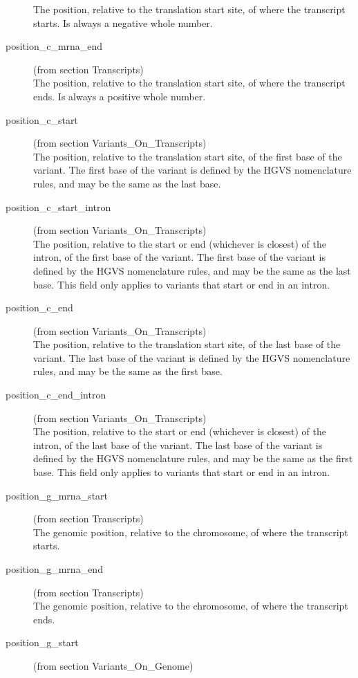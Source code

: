 \documentclass[a4paper,oneside,openany,12pt]{memoir}
\begin{document}
\begin{description}
  The position, relative to the translation start site, of where the transcript starts.
  Is always a negative whole number.
  \item[position\_c\_mrna\_end] (from section Transcripts)\hfill \\
  The position, relative to the translation start site, of where the transcript ends.
  Is always a positive whole number.
  \item[position\_c\_start] (from section Variants\_On\_Transcripts)\hfill \\
  The position, relative to the translation start site, of the first base of the variant.
  The first base of the variant is defined by the HGVS nomenclature rules, and may be the same as the last base.
  \item[position\_c\_start\_intron] (from section Variants\_On\_Transcripts)\hfill \\
  The position, relative to the start or end (whichever is closest) of the intron, of the first base of the variant.
  The first base of the variant is defined by the HGVS nomenclature rules, and may be the same as the last base.
  This field only applies to variants that start or end in an intron.
  \item[position\_c\_end] (from section Variants\_On\_Transcripts)\hfill \\
  The position, relative to the translation start site, of the last base of the variant.
  The last base of the variant is defined by the HGVS nomenclature rules, and may be the same as the first base.
  \item[position\_c\_end\_intron] (from section Variants\_On\_Transcripts)\hfill \\
  The position, relative to the start or end (whichever is closest) of the intron, of the last base of the variant.
  The last base of the variant is defined by the HGVS nomenclature rules, and may be the same as the first base.
  This field only applies to variants that start or end in an intron.
  \item[position\_g\_mrna\_start] (from section Transcripts)\hfill \\
  The genomic position, relative to the chromosome, of where the transcript starts.
  \item[position\_g\_mrna\_end] (from section Transcripts)\hfill \\
  The genomic position, relative to the chromosome, of where the transcript ends.
  \item[position\_g\_start] (from section Variants\_On\_Genome)\hfill \\

\end{description}
\end{document}
